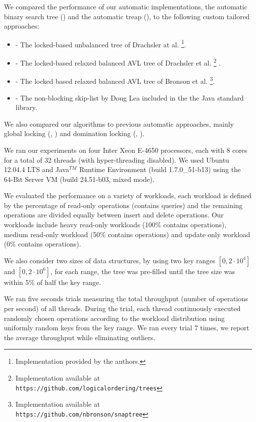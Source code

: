 We compared the performance of our automatic implementations, 
the automatic binary search tree (\autoTree) and the automatic
treap (\autoTreap), to the following custom tailored approaches: 
\begin{itemize}
\item \danaTree - The locked-based 
				unbalanced tree of Drachsler at al.\cite{DrachslerVY2014}
				\footnote{Implementation provided by the authors.}. 
\item \danaAVL - The locked-based relaxed balanced AVL tree of 
				Drachsler et al.\cite{DrachslerVY2014}
				\footnote{Implementation available at \\
				\texttt{https://github.com/logicalordering/trees}} .
\item \bronson - The locked based relaxed balanced AVL tree
				of Bronson et al.\cite{BronsonCCO2010}
				\footnote{Implementation available at \\
				\texttt{https://github.com/nbronson/snaptree}}.
\item \skiplist - The non-blocking skip-list by Doug 
				Lea included in the 
				the Java standard library.
\end{itemize}

We also compared our algorithms to previous automatic approaches, 
mainly global locking (\globalTree, \globalTreap) 
and domination locking (\domTree, \domTreap). 

We ran our experiments on four Inter Xeon E-4650 processors, 
each with 8 cores for a total of 32 threads 
(with hyper-threading disabled). 
We used Ubuntu 12.04.4 LTS and Java$^{TM}$ Runtime Environment (build
1.7.0\_51-b13) using the 64-Bit Server VM (build 24.51-b03, mixed mode).


We evaluated the performance on a variety of workloads, 
each workload is defined by the percentage of read-only
operations (contains queries) and the remaining operations 
are divided equally between insert and delete operations.
Our workloads include heavy read-only workloads
(100\% contains operations), medium read-only workload 
(50\% contains operations) and update only workload
(0\% contains operations). 

We also consider two sizes of data structures, by using two key ranges
$[0,2\cdot10^4]$ and $[0,2\cdot10^6]$, for each range, the tree was pre-filled until the tree size was 
within 5\% of half the key range.   

We ran five seconds trials measuring the total throughput
(number of operations per second) of all threads.
During the trial, each thread continuously executed randomly
chosen operations according to the workload distribution 
using uniformly random keys from the key range.  
We ran every trial 7 times, we report the average throughput
while eliminating outliers.


